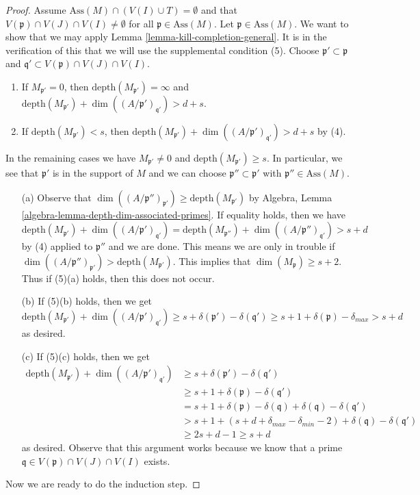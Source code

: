 \begin{proof}
\medskip\noindent
Assume $\text{Ass}(M) \cap (V(I) \cup T) = \emptyset$ and that
$V(\mathfrak p) \cap V(J) \cap V(I) \not = \emptyset$
for all $\mathfrak p \in \text{Ass}(M)$.
Let $\mathfrak p \in \text{Ass}(M)$. We want to show that we may apply
Lemma \ref{lemma-kill-completion-general}.
It is in the verification of this that we will use the supplemental
condition (5). Choose $\mathfrak p' \subset \mathfrak p$
and $\mathfrak q' \subset V(\mathfrak p) \cap V(J) \cap V(I)$.
\begin{enumerate}
\item If $M_{\mathfrak p'} = 0$, then
$\text{depth}(M_{\mathfrak p'}) = \infty$ and
$\text{depth}(M_{\mathfrak p'}) +
\dim((A/\mathfrak p')_{\mathfrak q'}) > d + s$.
\item If $\text{depth}(M_{\mathfrak p'}) < s$, then
$\text{depth}(M_{\mathfrak p'}) +
\dim((A/\mathfrak p')_{\mathfrak q'}) > d + s$ by (4).
\end{enumerate}
In the remaining cases we have $M_{\mathfrak p'} \not = 0$ and
$\text{depth}(M_{\mathfrak p'}) \geq s$. In particular, we see that
$\mathfrak p'$ is in the support of $M$ and we can choose
$\mathfrak p'' \subset \mathfrak p'$ with $\mathfrak p'' \in \text{Ass}(M)$.
\begin{enumerate}
\item[(a)] Observe that
$\dim((A/\mathfrak p'')_{\mathfrak p'}) \geq \text{depth}(M_{\mathfrak p'})$
by Algebra, Lemma \ref{algebra-lemma-depth-dim-associated-primes}.
If equality holds, then we have
$$
\text{depth}(M_{\mathfrak p'}) + \dim((A/\mathfrak p')_{\mathfrak q'}) =
\text{depth}(M_{\mathfrak p''}) + \dim((A/\mathfrak p'')_{\mathfrak q'})
> s + d
$$
by (4) applied to $\mathfrak p''$ and we are done. This means we are
only in trouble if
$\dim((A/\mathfrak p'')_{\mathfrak p'}) > \text{depth}(M_{\mathfrak p'})$.
This implies that $\dim(M_\mathfrak p) \geq s + 2$.
Thus if (5)(a) holds, then this does not occur.
\item[(b)] If (5)(b) holds, then we get
$$
\text{depth}(M_{\mathfrak p'}) + \dim((A/\mathfrak p')_{\mathfrak q'})
\geq s + \delta(\mathfrak p') - \delta(\mathfrak q')
\geq s + 1 + \delta(\mathfrak p) - \delta_{max}
> s + d
$$
as desired.
\item[(c)] If (5)(c) holds, then we get
\begin{align*}
\text{depth}(M_{\mathfrak p'}) + \dim((A/\mathfrak p')_{\mathfrak q'})
& \geq
s + \delta(\mathfrak p') - \delta(\mathfrak q') \\
& \geq
s + 1 + \delta(\mathfrak p) - \delta(\mathfrak q') \\
& =
s + 1 + \delta(\mathfrak p) - \delta(\mathfrak q) +
\delta(\mathfrak q) - \delta(\mathfrak q') \\
& >
s + 1 + (s + d + \delta_{max} - \delta_{min} - 2) +
\delta(\mathfrak q) - \delta(\mathfrak q') \\
& \geq 
2s + d - 1 \geq s + d
\end{align*}
as desired. Observe that this argument works because
we know that a prime $\mathfrak q \in V(\mathfrak p) \cap V(J) \cap V(I)$
exists.
\end{enumerate}
Now we are ready to do the induction step.


\end{proof}
